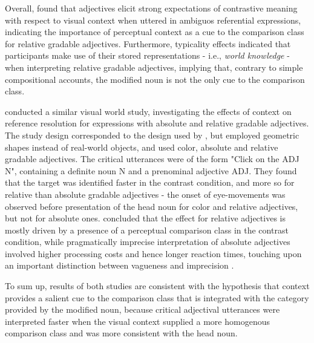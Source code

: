  Overall, \textcite{sedivy1999} found that adjectives elicit strong expectations of contrastive meaning with respect to visual context when uttered in ambiguos referential expressions, indicating the importance of perceptual context as a cue to the comparison class for relative gradable adjectives. Furthermore, typicality effects indicated that participants make use of their stored representations - i.e., \textit{world knowledge} - when interpreting relative gradable adjectives, implying that, contrary to simple compositional accounts, the modified noun is not the only cue to the comparison class. 
  
\textcite{Aparicio2016} conducted a similar visual world study, investigating the effects of context on reference resolution for expressions with absolute and relative gradable adjectives. 
The study design corresponded to the design used by \parencite{sedivy1999}, but employed geometric shapes instead of real-world objects, and used color, absolute and relative gradable adjectives.  The critical utterances were of the form "Click on the ADJ N", containing a definite noun N and a prenominal adjective ADJ. They found that the target was identified faster in the contrast condition, and more so for relative than absolute gradable adjectives - the onset of eye-movements was observed before presentation of the head noun for color and relative adjectives, but not for absolute ones. \textcite{Aparicio2016} concluded that the effect for relative adjectives is mostly driven by a presence of a perceptual comparison class in the contrast condition, while pragmatically imprecise interpretation of absolute adjectives involved higher processing costs and hence longer reaction times, touching upon an important distinction between vagueness and imprecision \parencite[cf.][]{Kennedy2007}. 

 To sum up, results of both studies are consistent with the  hypothesis that context provides a salient cue to the comparison class that is integrated with the category provided by the modified  noun, because critical adjectival utterances were interpreted faster when the visual context supplied a more homogenous comparison class and was more consistent with the head noun. 

